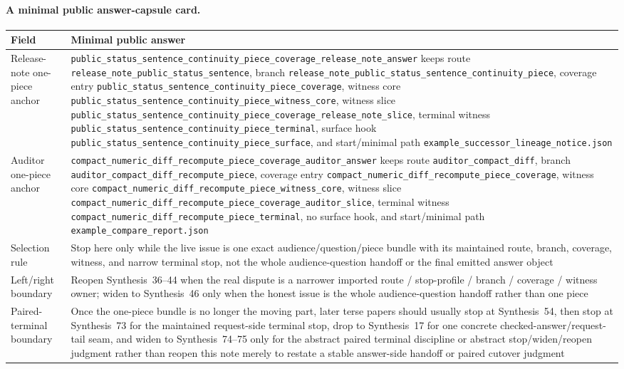 \documentclass[11pt]{article}
\begin{document}
\paragraph{A minimal public answer-capsule card.}
\begin{table}[t]
\centering
\small
\begin{tabularx}{\linewidth}{@{}Y Y@{}}
\toprule
Field & Minimal public answer \\
\midrule
Release-note one-piece anchor & \nolinkurl{public_status_sentence_continuity_piece_coverage_release_note_answer} keeps route \nolinkurl{release_note_public_status_sentence}, branch \nolinkurl{release_note_public_status_sentence_continuity_piece}, coverage entry \nolinkurl{public_status_sentence_continuity_piece_coverage}, witness core \nolinkurl{public_status_sentence_continuity_piece_witness_core}, witness slice \nolinkurl{public_status_sentence_continuity_piece_coverage_release_note_slice}, terminal witness \nolinkurl{public_status_sentence_continuity_piece_terminal}, surface hook \nolinkurl{public_status_sentence_continuity_piece_surface}, and start/minimal path \nolinkurl{example_successor_lineage_notice.json} \\
Auditor one-piece anchor & \nolinkurl{compact_numeric_diff_recompute_piece_coverage_auditor_answer} keeps route \nolinkurl{auditor_compact_diff}, branch \nolinkurl{auditor_compact_diff_recompute_piece}, coverage entry \nolinkurl{compact_numeric_diff_recompute_piece_coverage}, witness core \nolinkurl{compact_numeric_diff_recompute_piece_witness_core}, witness slice \nolinkurl{compact_numeric_diff_recompute_piece_coverage_auditor_slice}, terminal witness \nolinkurl{compact_numeric_diff_recompute_piece_terminal}, no surface hook, and start/minimal path \nolinkurl{example_compare_report.json} \\
Selection rule & Stop here only while the live issue is one exact audience/question/piece bundle with its maintained route, branch, coverage, witness, and narrow terminal stop, not the whole audience-question handoff or the final emitted answer object \\
Left/right boundary & Reopen Synthesis~36--44 when the real dispute is a narrower imported route / stop-profile / branch / coverage / witness owner; widen to Synthesis~46 only when the honest issue is the whole audience-question handoff rather than one piece \\
Paired-terminal boundary & Once the one-piece bundle is no longer the moving part, later terse papers should usually stop at Synthesis~54, then stop at Synthesis~73 for the maintained request-side terminal stop, drop to Synthesis~17 for one concrete checked-answer/request-tail seam, and widen to Synthesis~74--75 only for the abstract paired terminal discipline or abstract stop/widen/reopen judgment rather than reopen this note merely to restate a stable answer-side handoff or paired cutover judgment \\

\end{tabularx}
\end{table}
\end{document}
